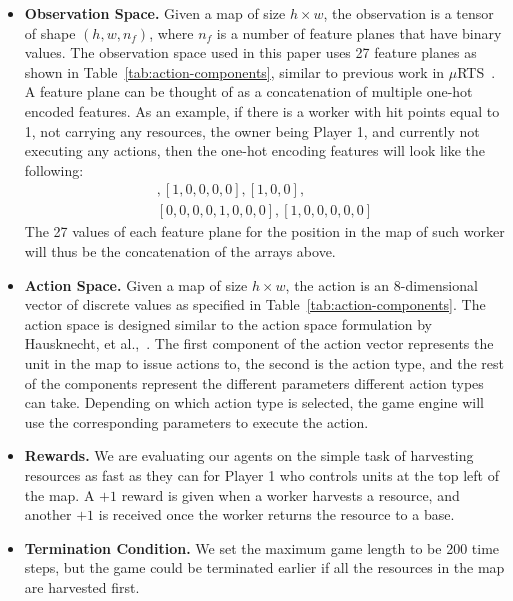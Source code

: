 \documentclass[letterpaper]{article}
\begin{document}
\begin{itemize}[leftmargin=*]
    \item \textbf{Observation Space.} Given a map of size $h\times w$, the observation is a tensor of shape $(h, w, n_f)$, where $n_f$ is a number of feature planes that have binary values. The observation space used in this paper uses 27 feature planes as shown in Table~\ref{tab:action-components}, similar to previous work in $\mu$RTS~\cite{stanescu2016evaluating,Yang2018LearningME,huang2019comparing}. A feature plane can be thought of as a concatenation of multiple one-hot encoded features. As an example, if there is a worker with hit points equal to 1, not carrying any resources, the owner being Player 1, and currently not executing any actions, then the one-hot encoding features will look like the following:
    \begin{align*}
        [0,1,0,0,0],  [1,0,0,0,0],  [1,0,0], \\ [0,0,0,0,1,0,0,0],  [1,0,0,0,0,0]
    \end{align*}
    The 27 values of each feature plane for the position in the map of such worker will thus be the concatenation of the arrays above.
    \item \textbf{Action Space.} Given a map of size $h\times w$, the action is an 8-dimensional vector of discrete values as specified in Table~\ref{tab:action-components}. The action space is designed similar to the action space formulation by Hausknecht, et al.,~\cite{hausknecht2015deep}. The first component of the action vector represents the unit in the map to issue actions to, the second is the action type, and the rest of the components represent the different parameters different action types can take. Depending on which action type is selected, the game engine will use the corresponding parameters to execute the action.
    \item \textbf{Rewards.} We are evaluating our agents on the simple task of harvesting resources as fast as they can for Player 1 who controls units at the top left of the map. A $+1$ reward is given when a worker harvests a resource, and another $+1$ is received once the worker returns the resource to a base.
    \item \textbf{Termination Condition.} We set the maximum game length to be 200 time steps, but the game could be terminated earlier if all the resources in the map are harvested first.

\end{itemize}
\end{document}

